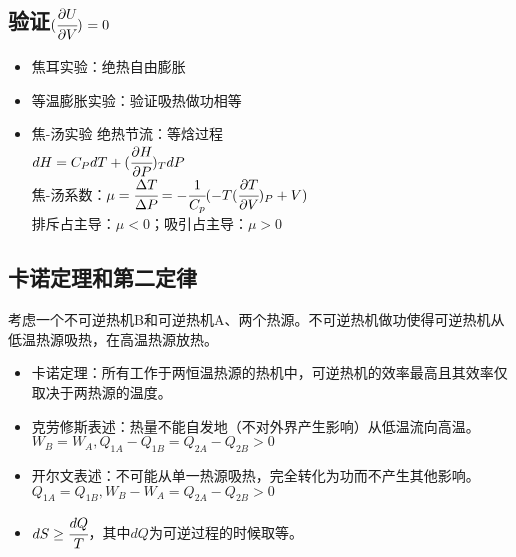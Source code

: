 \documentclass[a4paper,12pt]{article}
\newcommand{\myp}[3]{(\cfrac{\partial{#1}}{\partial{#2}})_{#3}}
\begin{document}
\subsection{验证$\myp{U}{V}{} = 0$}
\begin{itemize}
\item 焦耳实验：绝热自由膨胀
\item 等温膨胀实验：验证吸热做功相等
\item 焦-汤实验 绝热节流：等焓过程\\
$dH = C_P dT + \myp{H}{P}{T} dP$ \\
焦-汤系数：$\mu = \cfrac{\Delta T}{\Delta P} = - \cfrac{1}{C_p}(- T \myp{T}{V}{P} + V)$ \\
排斥占主导：$\mu < 0$；吸引占主导：$\mu > 0$
\end{itemize}
\subsection{卡诺定理和第二定律}
考虑一个不可逆热机B和可逆热机A、两个热源。不可逆热机做功使得可逆热机从低温热源吸热，在高温热源放热。\\
\begin{itemize}
\item 卡诺定理：所有工作于两恒温热源的热机中，可逆热机的效率最高且其效率仅取决于两热源的温度。
\item 克劳修斯表述：热量不能自发地（不对外界产生影响）从低温流向高温。$W_B = W_A, Q_{1A} - Q_{1B} = Q_{2A} - Q_{2B} > 0$
\item 开尔文表述：不可能从单一热源吸热，完全转化为功而不产生其他影响。$Q_{1A} = Q_{1B}, W_B - W_A = Q_{2A} - Q_{2B} > 0$
\item $dS \geq \cfrac{dQ}{T}$，其中$dQ$为可逆过程的时候取等。 
\end{itemize}
\end{document}
